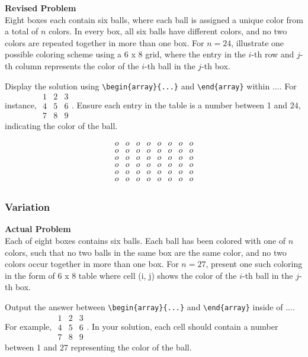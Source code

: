 \textbf{Revised Problem}\\
Eight boxes each contain six balls, where each ball is assigned a unique color from a total of $n$ colors. In every box, all six balls have different colors, and no two colors are repeated together in more than one box. For $n=24$, illustrate one possible coloring scheme using a 6 x 8 grid, where the entry in the $i$-th row and $j$-th column represents the color of the $i$-th ball in the $j$-th box.

Display the solution using \verb|\begin{array}{...}| and \verb|\end{array}| within $\boxed{...}$. For instance, $\boxed{\begin{array}{ccc}1 & 2 & 3 \\ 4 & 5 & 6 \\ 7 & 8 & 9\end{array}}$. Ensure each entry in the table is a number between 1 and $24$, indicating the color of the ball.

$$\begin{array}{cccccccc}
o & o & o & o & o & o & o & o \\
o & o & o & o & o & o & o & o \\
o & o & o & o & o & o & o & o \\
o & o & o & o & o & o & o & o \\
o & o & o & o & o & o & o & o \\
o & o & o & o & o & o & o & o \\
\end{array}$$

\subsubsection{Variation}
\textbf{Actual Problem}\\
Each of eight boxes contains six balls. Each ball has been colored with one of $n$ colors, such that no two balls in the same box are the same color, and no two colors occur together in more than one box.
For $n=27$, present one such coloring in the form of 6 x 8 table where cell (i, j) shows the color of the $i$-th ball in the $j$-th box.

Output the answer between \verb|\begin{array}{...}| and \verb|\end{array}| inside of $\boxed{...}$. For example, $\boxed{\begin{array}{ccc}1 & 2 & 3 \\ 4 & 5 & 6 \\ 7 & 8 & 9\end{array}}$.
In your solution, each cell should contain a number between 1 and $27$ representing the color of the ball.

